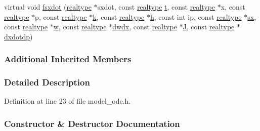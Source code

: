 \begin{DoxyCompactItemize}
\item 
virtual void \mbox{\hyperlink{classamici_1_1_model___o_d_e_afd49b292aecf540d4d751756647ada6e}{fsxdot}} (\mbox{\hyperlink{namespaceamici_a1bdce28051d6a53868f7ccbf5f2c14a3}{realtype}} $\ast$sxdot, const \mbox{\hyperlink{namespaceamici_a1bdce28051d6a53868f7ccbf5f2c14a3}{realtype}} \mbox{\hyperlink{classamici_1_1_model_a711281d57e9710226face29151cc4641}{t}}, const \mbox{\hyperlink{namespaceamici_a1bdce28051d6a53868f7ccbf5f2c14a3}{realtype}} $\ast$x, const \mbox{\hyperlink{namespaceamici_a1bdce28051d6a53868f7ccbf5f2c14a3}{realtype}} $\ast$p, const \mbox{\hyperlink{namespaceamici_a1bdce28051d6a53868f7ccbf5f2c14a3}{realtype}} $\ast$\mbox{\hyperlink{classamici_1_1_model_adde50e0d8a99d20354c8403bf93fab6f}{k}}, const \mbox{\hyperlink{namespaceamici_a1bdce28051d6a53868f7ccbf5f2c14a3}{realtype}} $\ast$\mbox{\hyperlink{classamici_1_1_model_a0e4df9c10406b35bd54f6f839322ca87}{h}}, const int ip, const \mbox{\hyperlink{namespaceamici_a1bdce28051d6a53868f7ccbf5f2c14a3}{realtype}} $\ast$\mbox{\hyperlink{classamici_1_1_model_ac3288cc7f649605938f1fd1b459d3d8c}{sx}}, const \mbox{\hyperlink{namespaceamici_a1bdce28051d6a53868f7ccbf5f2c14a3}{realtype}} $\ast$\mbox{\hyperlink{classamici_1_1_model_a6b305431617db7966c726f756e819843}{w}}, const \mbox{\hyperlink{namespaceamici_a1bdce28051d6a53868f7ccbf5f2c14a3}{realtype}} $\ast$\mbox{\hyperlink{classamici_1_1_model_a58b93c923b4fd9c0322c969954696210}{dwdx}}, const \mbox{\hyperlink{namespaceamici_a1bdce28051d6a53868f7ccbf5f2c14a3}{realtype}} $\ast$\mbox{\hyperlink{classamici_1_1_model_a23d87dde1f3cedfdd1a5b1e703e381ad}{J}}, const \mbox{\hyperlink{namespaceamici_a1bdce28051d6a53868f7ccbf5f2c14a3}{realtype}} $\ast$\mbox{\hyperlink{classamici_1_1_model_adba071f2419937047304600d4dad9b04}{dxdotdp}})
\end{DoxyCompactItemize}
\subsubsection*{Additional Inherited Members}


\subsubsection{Detailed Description}


Definition at line 23 of file model\+\_\+ode.\+h.



\subsubsection{Constructor \& Destructor Documentation}
\mbox{\label{classamici_1_1_model___o_d_e_ac1e4d80aa9b64e27e48c740d27b1d907}} 
